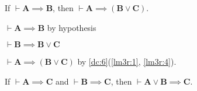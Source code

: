 \documentclass{amsart}%
\newcommand\metavariable[1]{\boldsymbol{#1}}
\begin{document}
\begin{lemma}\label{lem:prop:weakening-r}
If $\vdash\metavariable{A}\implies\metavariable{B}$, then $\vdash\metavariable{A}\implies(\metavariable{B}\lor\metavariable{C})$.
\end{lemma}

\begin{pf}
\item\label{lm3r:1} $\vdash\metavariable{A}\implies\metavariable{B}$ by hypothesis
\item\label{lm3r:4} $\vdash\metavariable{B}\implies\metavariable{B}\lor\metavariable{C}$
\item $\vdash\metavariable{A}\implies(\metavariable{B}\lor\metavariable{C})$
  by \ref{dc:6}(\ref{lm3r:1}, \ref{lm3r:4}).
\end{pf}

\begin{lemma}\label{lm:prop:weaken-premises}
If $\vdash\metavariable{A}\implies\metavariable{C}$
and $\vdash\metavariable{B}\implies\metavariable{C}$,
then $\vdash\metavariable{A}\lor\metavariable{B}\implies\metavariable{C}$.
\end{lemma}
\end{document}
